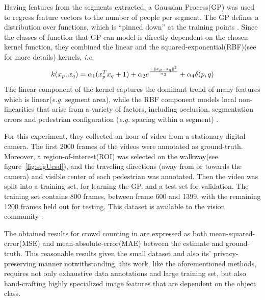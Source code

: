 Having features from the segments extracted, a Gaussian Process(GP) \cite{williams2006gaussian} was used to regress feature vectors to the number of people per segment. The GP defines a distribution over functions, which is “pinned down” at the training points \cite{chan2008privacy}. Since the classes of function that GP can model is directly dependent on the chosen kernel function, they combined the linear and the squared-exponential(RBF)(see \cite{chang2010training, vert2004primer, shashua2009introduction} for more details) kernels, \textit{i.e.}
\begin{equation}
\centering k(x_p, x_q) = \alpha_1(x_p^{T}x_q+1) + \alpha_2e^{\frac{-\|x_p-x_q\|^2}{\alpha_3}} + \alpha_4\delta(p,q)     
\end{equation}
The linear component of the kernel captures the dominant trend of many features which is linear(\textit{e.g.} segment area), while the RBF component models local non-linearities that arise from a variety of factors, including occlusion, segmentation errors and pedestrian configuration (\textit{e.g.} spacing within a segment) \cite{chan2008privacy}. 
  
For this experiment, they collected an hour of video from a stationary digital camera. The first 2000 frames of the videos were annotated as ground-truth. Moreover, a region-of-interest(ROI) was selected on the walkway(see figure~\ref{fig:segUcsd}), and the traveling directions (away from or towards the camera) and visible center of each pedestrian was annotated. Then the video was split into a training set, for learning the GP, and a test set for validation. The training set contains 800 frames, between frame 600 and 1399, with the remaining 1200 frames held out for testing. This dataset is available to the vision community \cite{chan2008privacy}.

The obtained results for crowd counting in  \cite{chan2008privacy} are expressed as both mean-squared-error(MSE) and mean-absolute-error(MAE) between the estimate and ground-truth. This reasonable results given the small dataset and also its' privacy-preserving manner notwithstanding, this work, like the aforementioned methods, requires not only exhaustive data annotations and large training set, but also hand-crafting highly specialized image features that are dependent on the object class. 


